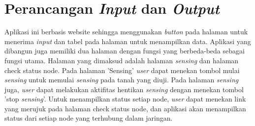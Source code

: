\section{Perancangan \textit{Input} dan \textit{Output}}
Aplikasi ini berbasis website sehingga menggunakan \textit{button} pada halaman untuk menerima \textit{input} dan tabel pada halaman untuk menampilkan data. Aplikasi yang dibangun juga memiliki dua halaman dengan fungsi yang berbeda-beda sebagai fungsi utama. Halaman yang dimaksud adalah halaman \textit{sensing} dan halaman check status node. Pada halaman 'Sensing' \textit{user} dapat menekan tombol mulai \textit{sensing} untuk memulai \textit{sensing} pada tanah yang diuji. Pada halaman \textit{sensing} juga, \textit{user} dapat melakukan aktifitas hentikan \textit{sensing} dengan menekan tombol 'stop \textit{sensing}'. Untuk menampilkan status setiap node, \textit{user} dapat menekan link yang merujuk pada halaman check status node, dan aplikasi akan menampilkan status dari setiap node yang terhubung dalam jaringan. 






		
			

